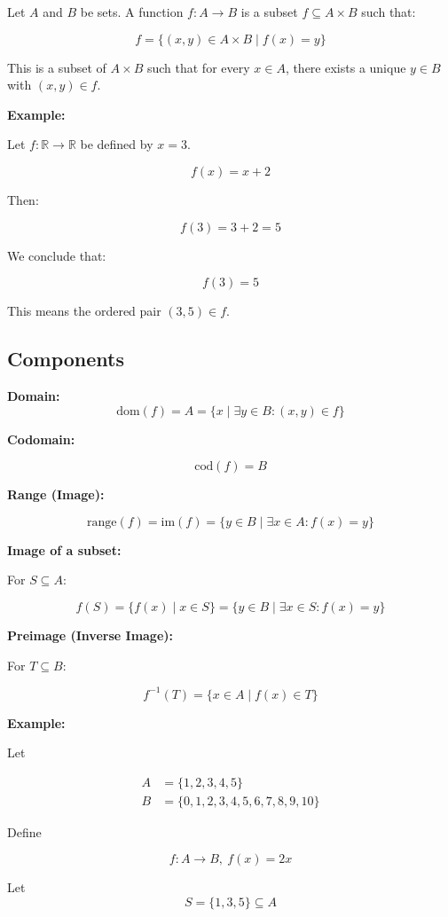 \documentclass[12pt,a4paper,openany]{article}
\begin{document}
Let $A$ and $B$ be sets. A function $f: A \to B$ is a subset $f \subseteq A \times B$ such that:

\[
f = \{(x, y) \in A \times B \mid f(x) = y \}
\]

This is a subset of $A \times B$ such that for every $x \in A$, there exists a unique $y \in B$ with $(x, y) \in f$.

\textbf{Example:}

Let $f: \mathbb{R} \to \mathbb{R}$ be defined by $x = 3.$

\[
f(x) = x + 2
\]

Then:

\[
f(3) = 3 + 2 = 5
\]

We conclude that:

\[
f(3) = 5
\]

This means the ordered pair $(3, 5) \in f$.

\subsection{Components}

\textbf{Domain:}
\[
\text{dom}(f) = A = \{x \mid \exists y \in B : (x, y) \in f\}
\]

\textbf{Codomain:}

\[
\text{cod}(f) = B
\]

\textbf{Range (Image):}

\[
\text{range}(f) = \text{im}(f) = \{y \in B \mid \exists x \in A : f(x) = y\}
\]

\textbf{Image of a subset:}

For $S \subseteq A$:

\[
f(S) = \{f(x) \mid x \in S\} = \{y \in B \mid \exists x \in S : f(x) = y\}
\]

\textbf{Preimage (Inverse Image):}

For $T \subseteq B$:

\[
f^{-1}(T) = \{x \in A \mid f(x) \in T\}
\]

\textbf{Example:}

Let

\[\begin{aligned}
A &= \{1, 2, 3, 4, 5\}\\
B &= \{0, 1, 2, 3, 4, 5, 6, 7, 8, 9, 10\}
\end{aligned}\]

Define

\[f: A \to B, \ f(x) = 2x\]

Let \[S = \{1, 3, 5\} \subseteq A\]
\end{document}
